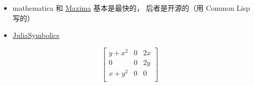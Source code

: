 
\begin{issues}
\issueDraft
\end{issues}

\begin{itemize}
\item mathematica 和 \href{https://maxima.sourceforge.io/}{Maxima} 基本是最快的， 后者是开源的（用 Common Lisp 写的）
\item \href{https://juliasymbolics.org/}{JuliaSymbolics}
\end{itemize}

\begin{equation}
\left[
\begin{array}{ccc}
y + x^{2} & 0 & 2 x \\
0 & 0 & 2 y \\
x + y^{2} & 0 & 0 \\
\end{array}
\right]
\end{equation}